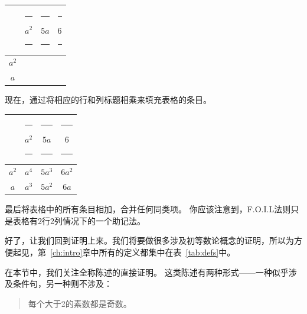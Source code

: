 \begin{center}
      \begin{tabular}{c|ccc}
                  & \rule{3pt}{0pt} $a^2$ \rule{3pt}{0pt} & \rule{3pt}{0pt}  $5a$ \rule{3pt}{0pt} & \rule{3pt}{0pt}  $6$  \rule{3pt}{0pt} \\ \hline
            $a^2$ &                                       &                                       &                                       \\
            $a$   &                                       &                                       &                                       \\
      \end{tabular}
\end{center}

现在，通过将相应的行和列标题相乘来填充表格的条目。

\begin{center}
      \begin{tabular}{c|ccc}
                  & \rule{3pt}{0pt}   $a^2$ \rule{3pt}{0pt} & \rule{3pt}{0pt}  $5a$  \rule{3pt}{0pt} & \rule{3pt}{0pt} $6$  \rule{3pt}{0pt} \\ \hline
            $a^2$ & $a^4$                                   & $5a^3$                                 & $6a^2$                               \\
            $a$   & $a^3$                                   & $5a^2$                                 & $6a$                                 \\
      \end{tabular}
\end{center}

最后将表格中的所有条目相加，合并任何同类项。
你应该注意到，F.O.I.L法则只是表格有2行2列情况下的一个助记法。

好了，让我们回到证明上来。我们将要做很多涉及初等数论概念的证明，所以为方便起见，第~\ref{ch:intro}章中所有的定义都集中在表~\ref{tab:defs}中。

\begin{table}[hbt]
      
      \caption{初等数论的定义重述。}
      \label{tab:defs}
\end{table}

\clearpage

在本节中，我们关注全称陈述的直接证明。
这类陈述有两种形式——一种似乎涉及条件句，另一种则不涉及：

\begin{quote} 
      每个大于2的素数都是奇数。
\end{quote}

